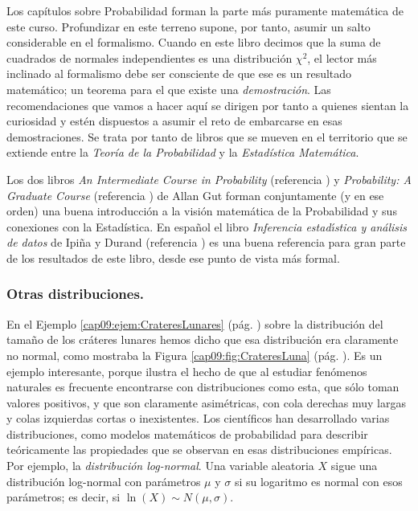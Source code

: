Los capítulos sobre Probabilidad forman la parte más puramente matemática de este curso. Profundizar en este terreno supone, por tanto, asumir un salto considerable en el formalismo. Cuando en este libro decimos que la suma de cuadrados de normales independientes es una distribución $\chi^2$, el lector más inclinado al formalismo debe ser consciente de que ese es un resultado matemático; un teorema para el que existe una {\em demostración}. Las recomendaciones que vamos a hacer aquí se dirigen por tanto a quienes sientan la curiosidad y estén dispuestos a asumir el reto de embarcarse en esas demostraciones. Se trata por tanto de libros que se mueven en el territorio que se extiende entre la {\em Teoría de la Probabilidad} y la {\em Estadística Matemática}.

Los dos libros {\em An Intermediate Course in Probability} (referencia \cite{gutIntermediateProbability}) y {\em Probability: A Graduate Course} (referencia \cite{gut2006probability}) de Allan Gut forman conjuntamente (y en ese orden) una buena introducción a la visión matemática de la Probabilidad y sus conexiones con la Estadística. En español el libro {\em Inferencia estad{\'\i}stica y an\'alisis de datos} de Ipiña y Durand (referencia \cite{inferenciaIpinnaDurand}) es una buena referencia para gran parte de los resultados de este libro, desde ese punto de vista más formal.

\subsubsection*{Otras distribuciones.}

En el Ejemplo \ref{cap09:ejem:CrateresLunares} (pág. \pageref{cap09:ejem:CrateresLunares}) sobre la distribución del tamaño de los cráteres lunares hemos dicho que esa distribución era claramente no normal, como mostraba la Figura \ref{cap09:fig:CrateresLuna} (pág. \pageref{cap09:fig:CrateresLuna}). Es un ejemplo interesante, porque ilustra el hecho de que al estudiar fenómenos naturales es frecuente encontrarse con distribuciones como esta, que sólo toman valores positivos, y que son claramente asimétricas, con cola derechas muy largas y colas izquierdas cortas o inexistentes. Los científicos han desarrollado varias distribuciones, como modelos matemáticos de probabilidad para describir teóricamente las propiedades que se observan en esas distribuciones empíricas. Por ejemplo, la {\em distribución log-normal}. Una variable aleatoria $X$ sigue una distribución log-normal con parámetros $\mu$ y $\sigma$ si su logaritmo es normal con esos parámetros; es decir, si $\ln(X)\sim N(\mu, \sigma)$.

